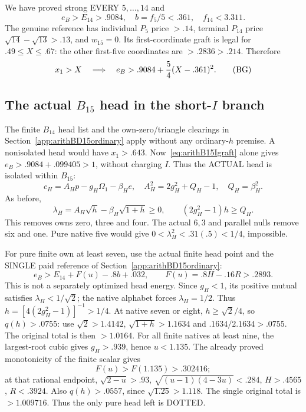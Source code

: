 We have proved strong EVERY \(5,\ldots,14\) and
\[
 e_B>E_{14}>.9084,\quad
 b=f_5/5<.361,\quad f_{14}<3.311 .
\tag{BW}\label{eq:arithB15Iwindow}
\]
The genuine reference has individual \(P_5\) price
\(>.14\), terminal \(P_{14}\) price
\(\sqrt{14}-\sqrt{13}>.13\), and \(w_{15}=0\).
Its first-coordinate graft is legal for
\(.49\le X\le.67\): the other first-five coordinates
are \(>.2836>.214\).
Therefore
\[
             x_1>X\quad\Longrightarrow\quad
             e_B>.9084+{5\over4}(X-.361)^2 .
\tag{BG}\label{eq:arithB15Igraft}
\]

\subsection{The actual \(B_{15}\) head in the short-\(I\) branch}
\label{app:arithB15Ihead}

The finite \(B_{14}\) head list and the own-zero/triangle
clearings in Section~\ref{app:arithBD15ordinary} apply
without any ordinary-\(h\) premise.
A nonisolated head would have \(x_1>.643\).
Now~\eqref{eq:arithB15Igraft} alone gives
\(e_B>.9084+.099405>1\), without charging \(I\).
Thus the ACTUAL head is isolated within \(B_{15}\):
\[
 c_H=A_Hp-g_H\Omega_1-\beta_H e,\quad
 A_H^2=2g_H^2+Q_H-1,\quad Q_H=\beta_H^2 .
\]
As before,
\[
 \lambda_H=A_H\sqrt h-\beta_H\sqrt{1+h}\ge0,\qquad
               (2g_H^2-1)h\ge Q_H .
\]
This removes owns zero, three and four.
The actual \(6,3\) and parallel nulls remove six and one.
Pure native five would give
\(0<\lambda_H^2<.31(.5)<1/4\), impossible.

For pure finite own at least seven, use the actual
finite head point and the SINGLE paid reference
of Section~\ref{app:arithBD15ordinary}:
\[
                e_B>E_{14}+F(u)-.8b+.032,\qquad
                F(u)=.8H-.16R>.2893 .
\]
This is not a separately optimized head energy.
Since \(g_H<1\), its positive mutual satisfies
\(\lambda_H<1/\sqrt2\); the native alphabet forces
\(\lambda_H=1/2\).
Thus \(h=[4(2g_H^2-1)]^{-1}>1/4\).
At native seven or eight,
\(h\ge\sqrt2/4\), so \(q(h)>.0755\):
use \(\sqrt2>1.4142\), \(\sqrt{1+h}>1.1634\)
and \(.1634/2.1634>.0755\).
The original total is then \(>1.0164\).
For all finite natives at least nine,
the largest-root cubic gives \(g_H>.939\), hence \(u<1.135\).
The already proved monotonicity of the finite scalar gives
\[
 F(u)>F(1.135)>.302416;
\]
at that rational endpoint,
\(\sqrt{2-u}>.93\), \(\sqrt{(u-1)(4-3u)}<.284\),
\(H>.4565\), \(R<.3924\).
Also \(q(h)>.0557\), since \(\sqrt{1.25}>1.118\).
The single original total is \(>1.009716\).
Thus the only pure head left is DOTTED.

